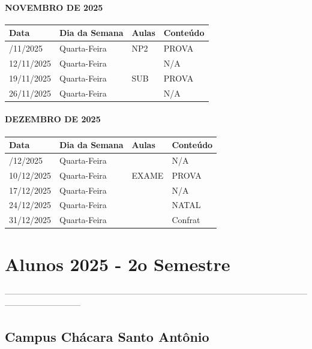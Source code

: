 \documentclass[
]{book}
\begin{document}
\paragraph{NOVEMBRO DE 2025}\label{novembro-de-2025}

\begin{longtable}[]{@{}llll@{}}
\toprule\noalign{}
Data & Dia da Semana & Aulas & Conteúdo \\
\midrule\noalign{}
\endhead
\bottomrule\noalign{}
\endlastfoot
05/11/2025 & Quarta-Feira & NP2 & PROVA \\
12/11/2025 & Quarta-Feira & & N/A \\
19/11/2025 & Quarta-Feira & SUB & PROVA \\
26/11/2025 & Quarta-Feira & & N/A \\
\end{longtable}

\paragraph{DEZEMBRO DE 2025}\label{dezembro-de-2025}

\begin{longtable}[]{@{}llll@{}}
\toprule\noalign{}
Data & Dia da Semana & Aulas & Conteúdo \\
\midrule\noalign{}
\endhead
\bottomrule\noalign{}
\endlastfoot
03/12/2025 & Quarta-Feira & & N/A \\
10/12/2025 & Quarta-Feira & EXAME & PROVA \\
17/12/2025 & Quarta-Feira & & N/A \\
24/12/2025 & Quarta-Feira & & NATAL \\
31/12/2025 & Quarta-Feira & & Confrat \\
\end{longtable}

\section{Alunos 2025 - 2o Semestre}\label{alunos-2025---2o-semestre}

---------------------------------------------------------------------------------------------------------------------------------------

\subsection{Campus Chácara Santo Antônio}\label{campus-chuxe1cara-santo-antuxf4nio}
\end{document}
